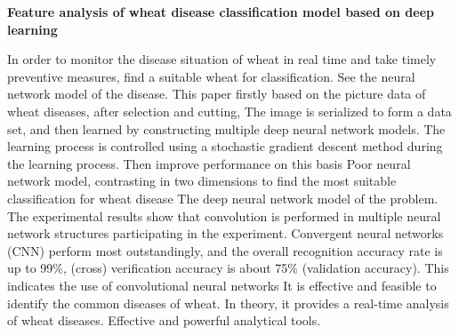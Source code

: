 \begin{abstract}
    为了实时监控小麦病害情况并及时采取防治措施，找出一种适合分类处理小麦常见病害的神经网络模型。\zs 
    本文首先以小麦病害\zs 图片资料为基础，经过挑选、裁剪后对图像进行序列化操作形成数据集，
    然后通过构建的多个深度神经网络模型进行学习，在学习过程中使用随机梯度下降法对学习过程进行控制。
    然后在此基础上改进表现较差的神经网络模型，在两个维度上形成对比，以此寻找最适合处理
    小麦病害分类问题的深度神经网络模型。实验结果表明，在参与实验的多个神经网络结构中，
    以卷积神经网络（convolutional neural networks，CNN）表现最为出众，
    整体识别准确率达99\%，（交叉）验证准确率在（validation accuracy）75\%左右。
    这表明使用卷积神经网络进行\zs 小麦常见病害的识别是有效且可行的，理论上\zs 为小麦病害的实时分析\zs 
    提供了有效且强力\zs 的分析手段。

\end{abstract}
\newpage

\begin{center}
    \fontsize{18pt}{18pt}\textbf{Feature analysis of wheat disease classification model based on deep learning}
\end{center}
\begin{enabstract}
    In order to monitor the disease situation of wheat in real time and take timely preventive measures, find a suitable wheat for classification.
    See the neural network model of the disease. This paper firstly based on the picture data of wheat diseases, after selection and cutting,
    The image is serialized to form a data set, and then learned by constructing multiple deep neural network models.
    The learning process is controlled using a stochastic gradient descent method during the learning process. Then improve performance on this basis
    Poor neural network model, contrasting in two dimensions to find the most suitable classification for wheat disease
    The deep neural network model of the problem. The experimental results show that convolution is performed in multiple neural network structures participating in the experiment.
    Convergent neural networks (CNN) perform most outstandingly, and the overall recognition accuracy rate is up to
    99\%, (cross) verification accuracy is about 75\% (validation accuracy). This indicates the use of convolutional neural networks
    It is effective and feasible to identify the common diseases of wheat. In theory, it provides a real-time analysis of wheat diseases.
    Effective and powerful analytical tools.

\end{enabstract}
\newpage